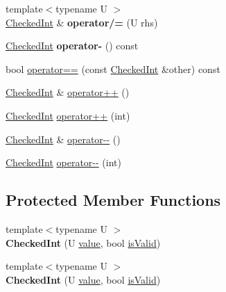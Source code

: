 \begin{DoxyCompactItemize}
\item 
\hypertarget{classmozilla_1_1_checked_int_aac2624fd4b61c3b66954f3c7bf45aac1}{{\footnotesize template$<$typename U $>$ }\\\hyperlink{classmozilla_1_1_checked_int}{Checked\-Int} \& {\bfseries operator/=} (U rhs)}\label{classmozilla_1_1_checked_int_aac2624fd4b61c3b66954f3c7bf45aac1}

\item 
\hypertarget{classmozilla_1_1_checked_int_a9113d9f3d9084a45123eaee1ccfc10b9}{\hyperlink{classmozilla_1_1_checked_int}{Checked\-Int} {\bfseries operator-\/} () const }\label{classmozilla_1_1_checked_int_a9113d9f3d9084a45123eaee1ccfc10b9}

\item 
bool \hyperlink{classmozilla_1_1_checked_int_aa3f459aecc1110200dab51b050bdf008}{operator==} (const \hyperlink{classmozilla_1_1_checked_int}{Checked\-Int} \&other) const 
\item 
\hyperlink{classmozilla_1_1_checked_int}{Checked\-Int} \& \hyperlink{classmozilla_1_1_checked_int_adacd246ebbc79a313cfdff357096d047}{operator++} ()
\item 
\hyperlink{classmozilla_1_1_checked_int}{Checked\-Int} \hyperlink{classmozilla_1_1_checked_int_a722019a310adedb97895149f627dc6bb}{operator++} (int)
\item 
\hyperlink{classmozilla_1_1_checked_int}{Checked\-Int} \& \hyperlink{classmozilla_1_1_checked_int_aba5cc6bf09a00fcc4749b6b66ff6b8d0}{operator-\/-\/} ()
\item 
\hyperlink{classmozilla_1_1_checked_int}{Checked\-Int} \hyperlink{classmozilla_1_1_checked_int_ab79d2ebe44bf3a6beb3234812213acfc}{operator-\/-\/} (int)
\end{DoxyCompactItemize}
\subsection*{Protected Member Functions}
\begin{DoxyCompactItemize}
\item 
\hypertarget{classmozilla_1_1_checked_int_a0cc907e1af97d6f01344af43d8c33e6e}{{\footnotesize template$<$typename U $>$ }\\{\bfseries Checked\-Int} (U \hyperlink{classmozilla_1_1_checked_int_a8b36b4a1c385abb43884bcb430fef088}{value}, bool \hyperlink{classmozilla_1_1_checked_int_aa875473e559646998e2cb4f0f54aedc3}{is\-Valid})}\label{classmozilla_1_1_checked_int_a0cc907e1af97d6f01344af43d8c33e6e}

\item 
\hypertarget{classmozilla_1_1_checked_int_a0cc907e1af97d6f01344af43d8c33e6e}{{\footnotesize template$<$typename U $>$ }\\{\bfseries Checked\-Int} (U \hyperlink{classmozilla_1_1_checked_int_a8b36b4a1c385abb43884bcb430fef088}{value}, bool \hyperlink{classmozilla_1_1_checked_int_aa875473e559646998e2cb4f0f54aedc3}{is\-Valid})}\label{classmozilla_1_1_checked_int_a0cc907e1af97d6f01344af43d8c33e6e}

\end{DoxyCompactItemize}

